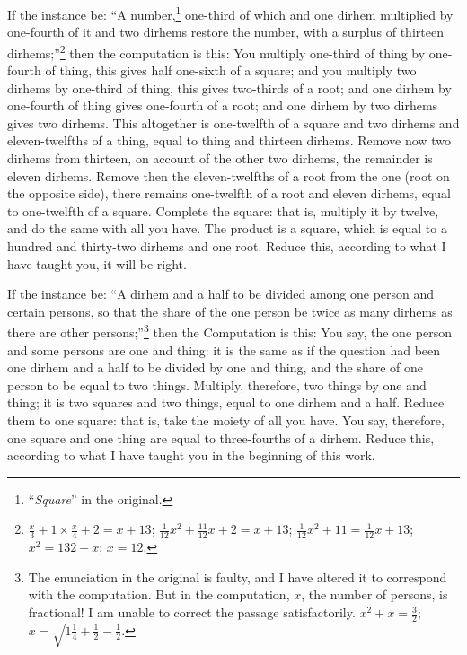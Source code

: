 If the instance be: ``A number,\footnote{``\textit{Square}'' in the original.} one-third of which and one dirhem multiplied by one-fourth of it and two dirhems restore the number, with a surplus of thirteen dirhems;''\footnote{$\frac{x}{3} + 1 \times \frac{x}{4} + 2 = x + 13$; $\frac{1}{12}x^2 + \frac{11}{12}x + 2 = x + 13$; $\frac{1}{12}x^2 + 11 = \frac{1}{12}x + 13$; $x^2 = 132 + x$; $x = 12$.} then the computation is this: You multiply one-third of thing by one-fourth of thing, this gives half one-sixth of a square; and you multiply two dirhems by one-third of thing, this gives two-thirds of a root; and one dirhem by one-fourth of thing gives one-fourth of a root; and one dirhem by two dirhems gives two dirhems. This altogether is one-twelfth of a square and two dirhems and eleven-twelfths of a thing, equal to thing and thirteen dirhems. Remove now two dirhems from thirteen, on account of the other two dirhems, the remainder is eleven dirhems. Remove then the eleven-twelfths of a root from the one (root on the opposite side), there remains one-twelfth of a root and eleven dirhems, equal to one-twelfth of a square. Complete the square: that is, multiply it by twelve, and do the same with all you have. The product is a square, which is equal to a hundred and thirty-two dirhems and one root. Reduce this, according to what I have taught you, it will be right.

If the instance be: ``A dirhem and a half to be divided among one person and certain persons, so that the share of the one person be twice as many dirhems as there are other persons;''\footnote{The enunciation in the original is faulty, and I have altered it to correspond with the computation. But in the computation, $x$, the number of persons, is fractional! I am unable to correct the passage satisfactorily. $x^2 + x = \frac{3}{2}$; $x = \sqrt{1\frac{1}{4} + \frac{1}{2}} - \frac{1}{2}$.} then the Computation is this: You say, the one person and some persons are one and thing: it is the same as if the question had been one dirhem and a half to be divided by one and thing, and the share of one person to be equal to two things. Multiply, therefore, two things by one and thing; it is two squares and two things, equal to one dirhem and a half. Reduce them to one square: that is, take the moiety of all you have. You say, therefore, one square and one thing are equal to three-fourths of a dirhem. Reduce this, according to what I have taught you in the beginning of this work.

